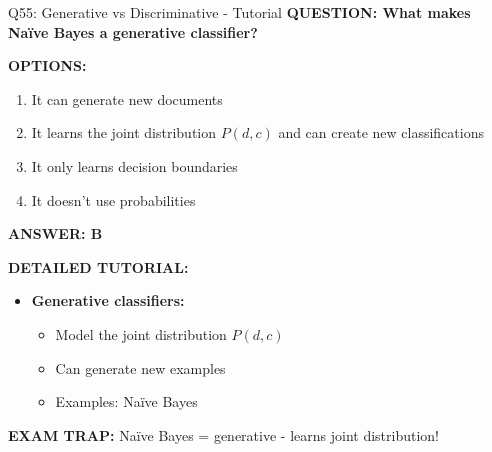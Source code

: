 \documentclass[8pt]{beamer}
\begin{document}
	\begin{frame}{Q55: Generative vs Discriminative - Tutorial}
		\fontsize{6.5}{7.5}\selectfont
		\textbf{QUESTION: What makes Naïve Bayes a generative classifier?}
		
		\vspace{0.1cm}
		\textbf{OPTIONS:}
		\begin{enumerate}
			\item It can generate new documents
			\item It learns the joint distribution $P(d,c)$ and can create new classifications
			\item It only learns decision boundaries
			\item It doesn't use probabilities
		\end{enumerate}
		
		\vspace{0.1cm}
		\textcolor{myblue}{\textbf{ANSWER: B}}
		
		\vspace{0.1cm}
		\textbf{DETAILED TUTORIAL:}
		\begin{itemize}
			\item \textbf{Generative classifiers:}
			\begin{itemize}
				\item Model the joint distribution $P(d,c)$
				\item Can generate new examples
				\item Examples: Naïve Bayes
			\end{itemize}
		\end{itemize}
		
		\textcolor{myred}{\textbf{EXAM TRAP:}} Naïve Bayes = \textcolor{myblue}{generative} - learns joint distribution!
	\end{frame}
	
\end{document}
